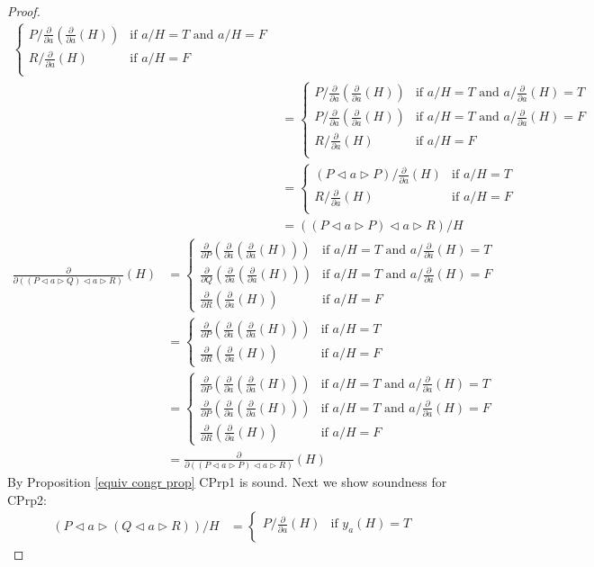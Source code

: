 \documentclass[a4paper,twoside,openright]{report}
\newcommand{\dd}[1]{\frac{\partial}{\partial #1}}
\newcommand{\lef}{\ensuremath{\triangleleft}}
\newcommand{\rig}{\ensuremath{\triangleright}}
\begin{document}
\begin{proof}
\begin{align*}
\begin{cases}
P/\dd a(\dd a(H)) & \text{if $a/H=T$ and $a/H=F$}\\
R/\dd a(H) & \text{if $a/H=F$}\\
\end{cases}\\
&=\begin{cases}
P/\dd a(\dd a(H)) & \text{if $a/H=T$ and $a/\dd a(H)=T$}\\
P/\dd a(\dd a(H)) & \text{if $a/H=T$ and $a/\dd a(H)=F$}\\
R/\dd a(H) & \text{if $a/H=F$}\\
\end{cases}\\
&=\begin{cases}
(P\lef a\rig P)/\dd a(H) & \text{if $a/H=T$}\\
R/\dd a(H) & \text{if $a/H=F$}\\
\end{cases}\\
&=((P\lef a\rig P)\lef a\rig R)/H
\end{align*}
\begin{align*}
\dd{((P\lef a\rig Q)\lef a\rig R)}(H)
&=\begin{cases}
\dd P(\dd a(\dd a(H))) & \text{if $a/H=T$ and $a/\dd a(H)=T$}\\
\dd Q(\dd a(\dd a(H))) & \text{if $a/H=T$ and $a/\dd a(H)=F$}\\
\dd R(\dd a(H)) & \text{if $a/H=F$}
\end{cases}\\
&=\begin{cases}
\dd P(\dd a(\dd a(H))) & \text{if $a/H=T$}\\
\dd R(\dd a(H)) & \text{if $a/H=F$}
\end{cases}\\
&=\begin{cases}
\dd P(\dd a(\dd a(H))) & \text{if $a/H=T$ and $a/\dd a(H)=T$}\\
\dd P(\dd a(\dd a(H))) & \text{if $a/H=T$ and $a/\dd a(H)=F$}\\
\dd R(\dd a(H)) & \text{if $a/H=F$}
\end{cases}\\
&=\dd{((P\lef a\rig P)\lef a\rig R)}(H)
\end{align*}
By Proposition \ref{equiv congr prop} CPrp1 is sound. Next we show soundness for CPrp2:
\begin{align*}
(P\lef a\rig (Q\lef a\rig R))/H
&=\begin{cases}
P/\dd a(H) & \text{if $y_a(H)=T$}\\

\end{cases}
\end{align*}
\end{proof}
\end{document}
